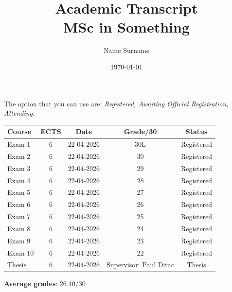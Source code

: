 \documentclass[a4paper]{article}
\title{\textbf{Academic Transcript} \\ \textbf{MSc in Something}}
\author{Name Surname}
\date{\today}
\begin{document}
\maketitle 




The option that you can use are: \textit{Registered, Awaiting Official Registration, Attending}.

\begin{table}[ht!]
    \centering
    \begin{tabular}{|p{}|c|c||c|c|}
        \bottomrule
        \rule{0ex}{3ex}
        \textbf{Course} & \textbf{ECTS} & \textbf{Date} & \textbf{Grade/30} & \textbf{Status} \\[1ex]
        \toprule
        \bottomrule
        \hline
        Exam 1 & 6 & 22-04-2026 & 30L & Registered \\
        \hline
        Exam 2 & 6 & 22-04-2026 & 30 & Registered \\
        \hline
        Exam 3 & 6 & 22-04-2026 & 29 & Registered \\
        \hline
        Exam 4 & 6 & 22-04-2026 & 28 & Registered \\
        \hline
        Exam 5 & 6 & 22-04-2026 & 27 & Registered \\
        \hline
        Exam 6 & 6 & 22-04-2026 & 26 & Registered \\
        \hline
        Exam 7 & 6 & 22-04-2026 & 25 & Registered \\
        \hline
        Exam 8 & 6 & 22-04-2026 & 24 & Registered \\
        \hline
        Exam 9 & 6 & 22-04-2026 & 23 & Registered \\
        \hline
        Exam 10 & 6 & 22-04-2026 & 22 & Registered \\
        \hline
        Thesis & 6 & 22-04-2026 & Supervisor: Paul Dirac & \href{link}{Thesis} \\
        \toprule
    \end{tabular}
\end{table}
\hfill \textbf{Average grades}: 26.40/30
\end{document}
